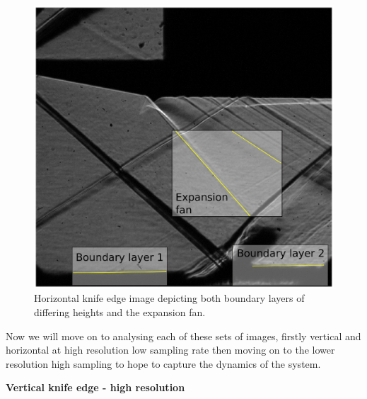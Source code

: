 \documentclass[a4paper,10pt,twoside]{article}
\begin{document}
\begin{multicols}{2}
\begin{figure}[H]
    \centering
    \includegraphics[width=\linewidth]{hor_highres.eps}
    \caption{Horizontal knife edge image depicting both boundary layers of differing heights and the expansion fan.}
    \label{fig:my_label}
\end{figure}



Now we will move on to analysing each of these sets of images, firstly vertical and horizontal at high resolution low sampling rate then moving on to the lower resolution high sampling to hope to capture the dynamics of the system. \par





\vspace{5mm}
\centerline{\textbf{Vertical knife edge - high resolution}}
\vspace{5mm}






\end{multicols}
\end{document}
